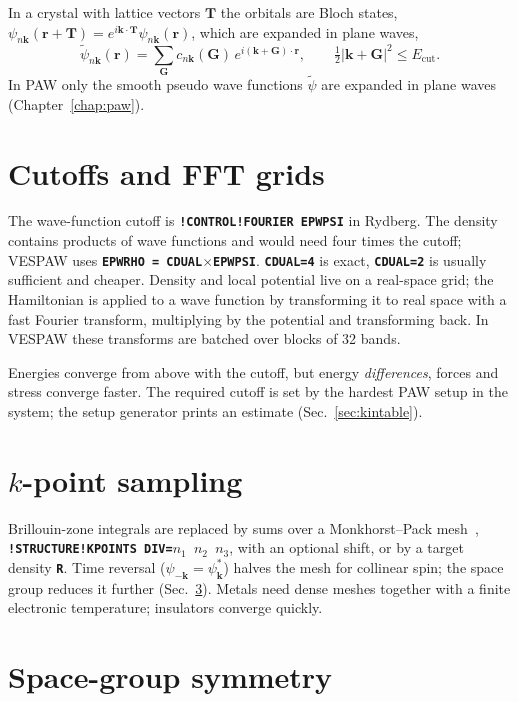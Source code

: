 \documentclass[11pt,a4paper,oneside]{book}
\newcommand{\key}[1]{\textbf{\texttt{#1}}}
\begin{document}
In a crystal with lattice vectors $\bm T$ the orbitals are Bloch states,
$\psi_{n\bm k}(\bm r+\bm T)=e^{i\bm k\cdot\bm T}\psi_{n\bm k}(\bm r)$,
which are expanded in plane waves,
\begin{equation}
  \tilde\psi_{n\bm k}(\bm r)=\sum_{\bm G} c_{n\bm k}(\bm G)\,
  e^{i(\bm k+\bm G)\cdot\bm r},
  \qquad \tfrac12|\bm k+\bm G|^2\le E_{\mathrm{cut}} .
\end{equation}
In PAW only the smooth pseudo wave functions $\tilde\psi$ are expanded in
plane waves (Chapter~\ref{chap:paw}).

\section{Cutoffs and FFT grids}

The wave-function cutoff is \key{!CONTROL!FOURIER EPWPSI} in Rydberg. The
density contains products of wave functions and would need four times the
cutoff; VESPAW uses \key{EPWRHO = CDUAL$\times$EPWPSI}. \key{CDUAL=4} is
exact, \key{CDUAL=2} is usually sufficient and cheaper. Density and local
potential live on a real-space grid; the Hamiltonian is applied to a
wave function by transforming it to real space with a fast Fourier
transform, multiplying by the potential and transforming back. In VESPAW
these transforms are batched over blocks of 32 bands.

Energies converge from above with the cutoff, but energy
\emph{differences}, forces and stress converge faster. The required cutoff
is set by the hardest PAW setup in the system; the setup generator
prints an estimate (Sec.~\ref{sec:kintable}).

\section{$k$-point sampling}

Brillouin-zone integrals are replaced by sums over a Monkhorst--Pack
mesh~\cite{MonkhorstPack1976}, \key{!STRUCTURE!KPOINTS DIV=$n_1$ $n_2$
$n_3$}, with an optional shift, or by a target density \key{R}.
Time reversal ($\psi_{-\bm k}=\psi_{\bm k}^*$) halves the mesh for
collinear spin; the space group reduces it further
(Sec.~\ref{sec:symmetry}). Metals need dense meshes together with a
finite electronic temperature; insulators converge quickly.

\section{Space-group symmetry}\label{sec:symmetry}
\end{document}
